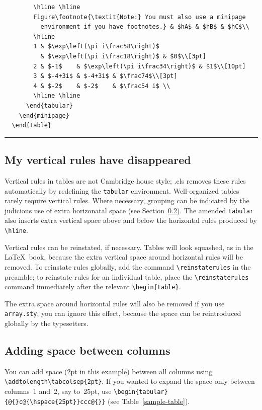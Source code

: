 \begin{table}
\begin{verbatim}
        \hline \hline
        Figure\footnote{\textit{Note:} You must also use a minipage
          environment if you have footnotes.} & $hA$ & $hB$ & $hC$\\
        \hline
        1 & $\exp\left(\pi i\frac58\right)$
          & $\exp\left(\pi i\frac18\right)$ & $0$\\[3pt]
        2 & $-1$    & $\exp\left(\pi i\frac34\right)$ & $1$\\[10pt]
        3 & $-4+3i$ & $-4+3i$ & $\frac74$\\[3pt]
        4 & $-2$    & $-2$    & $\frac54 i$ \\
        \hline \hline
      \end{tabular}
    \end{minipage}
  \end{table}
\end{verbatim}
\rule[20pt]{\textwidth}{0.5pt}
  \end{table}

\subsection{My vertical rules have disappeared}
Vertical rules in tables are not Cambridge house style; {\cambridge}.cls
removes these rules automatically by redefining the \verb"tabular" environment.
Well-organized tables rarely require vertical rules. Where necessary,
grouping can be indicated by the judicious use of extra horizonatal space
(see Section~\ref{addhoriz}). The amended \verb"tabular" also inserts extra
vertical space above and below the horizontal rules produced by \verb"\hline".

Vertical rules can be reinstated, if necessary. Tables will look squashed,
as in the \LaTeX\ book, because the extra vertical space around horizontal
rules will be removed. To reinstate rules globally, add the command
\verb"\reinstaterules" in the preamble; to reinstate rules for an
individual table, place the \verb"\reinstaterules" command
immediately after the relevant \verb"\begin{table}".

The extra space around horizontal rules will also be removed if
you use \verb"array.sty"; you can ignore this effect, because the space
can be reintroduced globally by the typesetters.

\subsection{Adding space between columns}
\label{addhoriz}
You can add space (2pt in this example) between all columns using\linebreak
\verb"\addtolength\tabcolsep{2pt}". If you wanted to expand the space
only between columns~1 and~2, say to~25pt, use
\verb"\begin{tabular}{@{}c@{\hspace{25pt}}ccc@{}}" (see Table~\ref{sample-table}).


